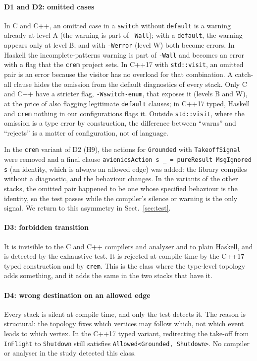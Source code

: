 \documentclass[review,12pt]{elsarticle}
\newcommand{\code}[1]{\texttt{#1}}
\newcommand{\crem}{\texttt{crem}}
\begin{document}
\paragraph{D1 and D2: omitted cases} In C and C++, an omitted case in a \code{switch} without \code{default} is a warning already at level A (the warning is part of \code{-Wall}); with a \code{default}, the warning appears only at level B; and with \code{-Werror} (level W) both become errors. In Haskell the incomplete-patterns warning is part of \code{-Wall} and becomes an error with a flag that the \crem{} project sets. In C++17 with \code{std::visit}, an omitted pair is an error because the visitor has no overload for that combination. A catch-all clause hides the omission from the default diagnostics of every stack. Only C and C++ have a stricter flag, \code{-Wswitch-enum}, that exposes it (levels B and W), at the price of also flagging legitimate \code{default} clauses; in C++17 typed, Haskell and \crem{} nothing in our configurations flags it. Outside \code{std::visit}, where the omission is a type error by construction, the difference between ``warns'' and ``rejects'' is a matter of configuration, not of language.

In the \crem{} variant of D2 (H9), the actions for \code{Grounded} with \code{TakeoffSignal} were removed and a final clause \code{avionicsAction s \_ = pureResult MsgIgnored s} (an identity, which is always an allowed edge) was added: the library compiles without a diagnostic, and the behaviour changes. In the variants of the other stacks, the omitted pair happened to be one whose specified behaviour is the identity, so the test passes while the compiler's silence or warning is the only signal. We return to this asymmetry in Sect.~\ref{sec:test}.

\paragraph{D3: forbidden transition} It is invisible to the C and C++ compilers and analyser and to plain Haskell, and is detected by the exhaustive test. It is rejected at compile time by the C++17 typed construction and by \crem{}. This is the class where the type-level topology adds something, and it adds the same in the two stacks that have it.

\paragraph{D4: wrong destination on an allowed edge} Every stack is silent at compile time, and only the test detects it. The reason is structural: the topology fixes which vertices may follow which, not which event leads to which vertex. In the C++17 typed variant, redirecting the take-off from \code{InFlight} to \code{Shutdown} still satisfies \code{Allowed<Grounded, Shutdown>}. No compiler or analyser in the study detected this class.
\end{document}
